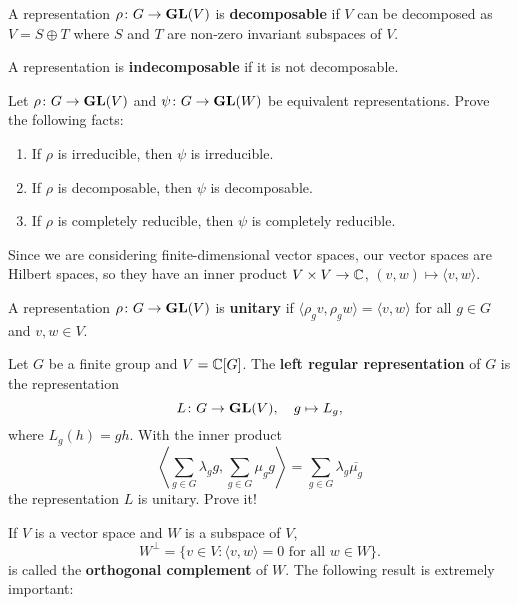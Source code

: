 \begin{definition}
A representation
$\rho\colon G\to\mathbf{GL}(V)$ is \textbf{decomposable} if $V$ can be decomposed as $V=S\oplus T$
where $S$ and $T$ are non-zero invariant subspaces of $V$. 
\end{definition}

A representation is 
\textbf{indecomposable} if it is not decomposable. 

\begin{exercise}
\label{xca:equivalence}
	Let $\rho\colon G\to\mathbf{GL}(V)$ and $\psi\colon G\to\mathbf{GL}(W)$ be equivalent representations.
	Prove the following facts:
	\begin{enumerate}
		\item If $\rho$ is irreducible, then $\psi$ is irreducible.
		\item If $\rho$ is decomposable, then $\psi$ is decomposable.
		\item If $\rho$ is completely reducible, then $\psi$ is completely reducible. 
	\end{enumerate}	
\end{exercise}

Since we are considering finite-dimensional vector spaces, our vector spaces are
Hilbert spaces, so they have
an inner product $V\times V\to\mathbb{C}$, $(v,w)\mapsto\langle v,w\rangle$.

\begin{definition}
    A representation $\rho\colon G\to\mathbf{GL}(V)$ is \textbf{unitary} if
    $\langle \rho_gv,\rho_gw\rangle=\langle v,w\rangle$ for all $g\in G$ and $v,w\in V$.
\end{definition}

\begin{example}
Let $G$ be a finite group and $V=\mathbb{C}[G]$. The \textbf{left regular representation}
of $G$ is the representation
\[
L\colon G\to\mathbf{GL}(V),
\quad
g\mapsto L_g,
\]
where $L_g(h)=gh$. With the inner product
\[
\left\langle\sum_{g\in G}\lambda_gg,\sum_{g\in G}\mu_gg\right\rangle=\sum_{g\in G}\lambda_g\overline{\mu_g}
\]
the representation $L$ is unitary. Prove it! 
\end{example}



If $V$ is a vector space and $W$ is a subspace of $V$, 
\[
W^\perp = \{v\in V:\langle v,w\rangle=0\text{ for all $w\in W$}\}.
\]
is called the 
\textbf{orthogonal complement} of $W$. The following result is extremely important: 

